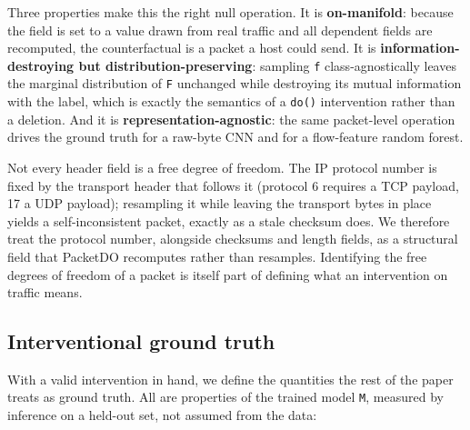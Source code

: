 \documentclass[journal]{IEEEtran}
\begin{document}
Three properties make this the right null operation. It is
\textbf{on-manifold}: because the field is set to a value drawn from
real traffic and all dependent fields are recomputed, the counterfactual
is a packet a host could send. It is \textbf{information-destroying but
distribution-preserving}: sampling \texttt{f} class-agnostically leaves
the marginal distribution of \texttt{F} unchanged while destroying its
mutual information with the label, which is exactly the semantics of a
\texttt{do()} intervention rather than a deletion. And it is
\textbf{representation-agnostic}: the same packet-level operation drives
the ground truth for a raw-byte CNN and for a flow-feature random
forest.

Not every header field is a free degree of freedom. The IP protocol
number is fixed by the transport header that follows it (protocol 6
requires a TCP payload, 17 a UDP payload); resampling it while leaving
the transport bytes in place yields a self-inconsistent packet, exactly
as a stale checksum does. We therefore treat the protocol number,
alongside checksums and length fields, as a structural field that
PacketDO recomputes rather than resamples. Identifying the free degrees
of freedom of a packet is itself part of defining what an intervention
on traffic means.

\subsection{Interventional ground truth}

With a valid intervention in hand, we define the quantities the rest of
the paper treats as ground truth. All are properties of the trained
model \texttt{M}, measured by inference on a held-out set, not assumed
from the data:
\end{document}
